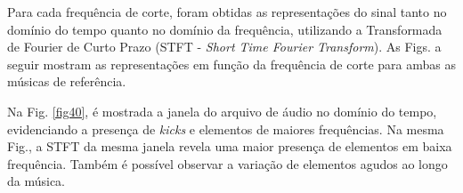 Para cada frequência de corte, foram obtidas as representações do sinal tanto no domínio do tempo quanto no domínio da frequência, utilizando a Transformada de Fourier de Curto Prazo (STFT - \textit{Short Time Fourier Transform}). 
As Figs. a seguir mostram as representações em função da frequência de corte para ambas as músicas de referência.

Na Fig. \ref{fig40}, é mostrada a janela do arquivo de áudio no domínio do tempo, evidenciando a presença de \textit{kicks} e elementos de maiores frequências. Na mesma Fig., a STFT da mesma janela revela uma maior presença de elementos em baixa frequência. Também é possível observar a variação de elementos agudos ao longo da música.

